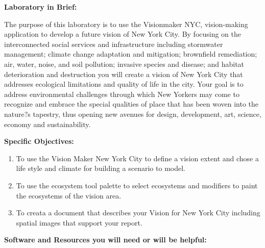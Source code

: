 \documentclass{article}
\begin{document}
\newpage


\large{\textbf{Laboratory in Brief:}}

\vspace{4mm}

\setlength{\leftskip}{1cm}

\setlength{\parindent}{0cm}

The purpose of this laboratory is to use the Visionmaker NYC, vision-making application to develop a future vision of New York City.  By focusing on the interconnected social services and infrastructure including stormwater management; climate change adaptation and mitigation; brownfield remediation; air, water, noise, and soil pollution; invasive species and disease; and habitat deterioration and destruction you will create a vision of New York City that addresses ecological  limitations and quality of life in the city. Your goal is to address environmental challenges through which New Yorkers may come to recognize and embrace the special qualities of place that has been woven into the nature?s tapestry, thus opening new avenues for design, development, art, science, economy and sustainability.

\vspace{4mm}

\setlength{\leftskip}{0cm}

\large{\textbf{Specific Objectives:}}

\begin{enumerate}[leftmargin=15mm]

\item To use the Vision Maker New York City to define a vision extent and chose a life style and climate for building a scenario to model.

\item To use the ecosystem tool palette to select ecosystems and modifiers to paint the ecosystems of the vision area.  

\item To creata a document that describes your Vision for New York City including spatial images that support your report.

\end{enumerate}


\large{\textbf{Software and Resources you will need or will be helpful:}}
\end{document}
